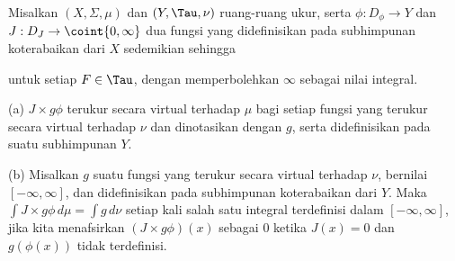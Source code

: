 
 Misalkan $(X,\Sigma,\mu)$ dan $(Y,\Tau,\nu)$
ruang-ruang ukur, serta $\phi:D_{\phi}\to Y$ dan
$J:D_J\to\coint{0,\infty}$ dua fungsi yang didefinisikan pada subhimpunan
koterabaikan dari $X$ sedemikian sehingga


\noindent untuk setiap $F\in\Tau$, dengan memperbolehkan $\infty$ sebagai
nilai integral.

(a) $J\times g\phi$ terukur secara virtual terhadap $\mu$ bagi setiap
fungsi yang terukur secara virtual terhadap $\nu$ dan dinotasikan dengan
$g$, serta didefinisikan pada suatu subhimpunan $Y$.

(b) Misalkan $g$ suatu fungsi yang terukur secara virtual terhadap
$\nu$, bernilai $[-\infty,\infty]$, dan didefinisikan pada subhimpunan
koterabaikan dari $Y$. Maka
$\int J\times g\phi\,d\mu=\int g\,d\nu$ setiap kali salah satu integral
terdefinisi dalam $[-\infty,\infty]$, jika kita menafsirkan
$(J\times g\phi)(x)$ sebagai $0$ ketika $J(x)=0$ dan $g(\phi(x))$ tidak
terdefinisi.

